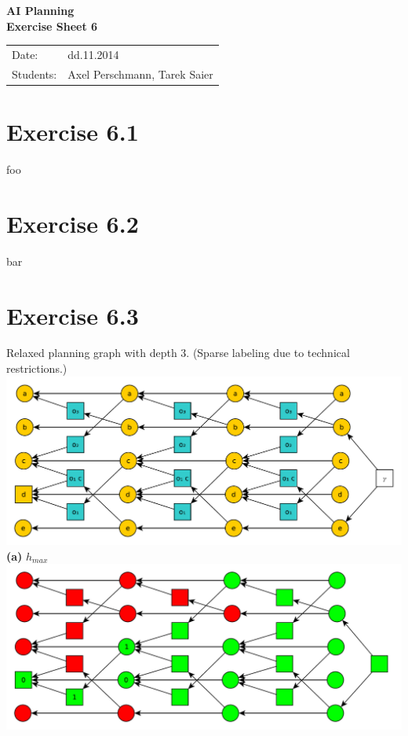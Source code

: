 \documentclass[11pt,a4paper]{article}
\begin{document}
\begin{center}
\Huge{\textbf{AI Planning}}\\
\LARGE{\textbf{Exercise Sheet 6}}
\end{center}
\vspace{2cm}
\begin{tabular}{ll}
Date: & dd.11.2014\\
Students: & Axel Perschmann, Tarek Saier
\end{tabular}

\section*{Exercise 6.1}
foo

\section*{Exercise 6.2}
bar

\section*{Exercise 6.3}
Relaxed planning graph with depth 3. (Sparse labeling due to technical restrictions.)
\includegraphics[scale=0.6]{g631}\\
\textbf{(a)} $h_{max}$\\
\includegraphics[scale=0.6]{g631a}\\
\end{document}
